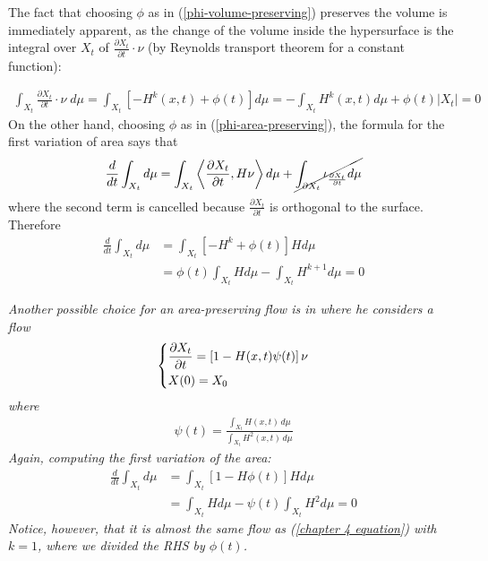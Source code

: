 The fact that choosing $\phi$ as in (\ref{phi-volume-preserving}) preserves the volume is immediately apparent, as the change of the volume inside the hypersurface is the integral over $X_t$ of $\frac{\partial X_t}{\partial t}\cdot \nu$ (by Reynolds transport theorem for a constant function): 

\begin{align*}
		\int_{X_t}\frac{\partial X_t}{\partial t}\cdot \nu \;d\mu= \int_{X_t} \left[- H^k(x, t) + \phi(t)\right] d\mu = - \int_{X_t}  H^k(x, t) d\mu + \phi(t)|X_t|=0
\end{align*}
On the other hand, choosing $\phi$ as in (\ref{phi-area-preserving}), the formula for the first variation of area says that 
\begin{align*}
	\frac{d}{d t}\int_{X_t} d\mu = \int_{X_t} \left\langle\frac{\partial X_t}{\partial t} , H \nu \right\rangle d\mu  +\cancel{\int_{\partial X_t}\iota_{\frac{\partial X_t}{\partial t}}  d\mu}
\end{align*}
where the second term is cancelled because $\frac{\partial X_t}{\partial t}$ is orthogonal to the surface. Therefore
\begin{align*}
	\frac{d}{d t}\int_{X_t} d\mu &= \int_{X_t}  \left[- H^k + \phi(t)\right] H d\mu \\
	&= \phi(t)\int_{X_t} H d\mu  - \int_{X_t}  H^{k+1} d\mu  = 0
\end{align*}

\begin{oss}\em
Another possible choice for an area-preserving flow is in \cite{mccoy} where he considers a flow 
\begin{align}
	\begin{dcases}
		\frac{\partial X_t}{\partial t} = \left[1 - H(x, t)  \psi(t)\right] \nu\\
		X(0)= X_0
	\end{dcases} \label{mccoy equation}
\end{align}
where 
\begin{align*}
	\psi(t) = \frac{\int_{X_t} H(x, t) \, d\mu}{\int_{X_t} H^{2}(x, t) \, d\mu}
\end{align*}
Again, computing the first variation of the area:
\begin{align*}
	\frac{d}{d t}\int_{X_t} d\mu &= \int_{X_t}  \left[1 - H\phi(t)\right] H d\mu \\
	&= \int_{X_t}  H d\mu  - \psi(t)\int_{X_t} H^{2} d\mu = 0
\end{align*}
Notice, however, that it is almost the same flow as (\ref{chapter 4 equation}) with $k=1$, where we divided the RHS by $\phi(t)$.
\end{oss}
